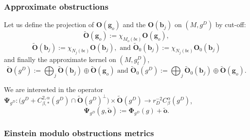 \documentclass[12pt]{article}
\begin{document}
    \subsubsection{Approximate obstructions}
    Let us define the projection of $\mathbf{O}(\mathbf{g}_o)$ and the $\mathbf{O}(\mathbf{b}_j)$ on $(M,g^D)$ by cut-off:
    \begin{equation}
        \tilde{\mathbf{O}}(\mathbf{g}_o):=\chi_{M_o(b\epsilon)}\mathbf{O}(\mathbf{g}_o),\label{tildOgo}
    \end{equation}
    \begin{equation}
        \tilde{\mathbf{O}}(\mathbf{b}_j):=\chi_{N_j(b\epsilon)}\mathbf{O}(\mathbf{b}_j), \text{ and } \tilde{\mathbf{O}}_0(\mathbf{b}_j):=\chi_{N_j(b\epsilon)}\mathbf{O}_0(\mathbf{b}_j) \label{tildOgb}
    \end{equation}
    and finally the approximate kernel on $(M,g^D_t)$,
    \begin{equation}
        \tilde{\mathbf{O}}(g^D):= \bigoplus_j\tilde{\mathbf{O}}(\mathbf{b}_j) \oplus \tilde{\mathbf{O}}(\mathbf{g}_o) \text{ and } \tilde{\mathbf{O}}_0(g^D):= \bigoplus_j\tilde{\mathbf{O}}_0(\mathbf{b}_j) \oplus \tilde{\mathbf{O}}(\mathbf{g}_o).\label{tildOgD}
    \end{equation}
    
    We are interested in the operator $\mathbf{\Psi}_{g^D}: \big(g^D+C^{2,\alpha}_{\beta,*}(g^D)\cap \tilde{\mathbf{O}}(g^D)^\perp\big)\times \tilde{\mathbf{O}}(g^D)\to r_D^{-2}C^\alpha_\beta(g^D)$,
    \begin{equation}
        \mathbf{\Psi}_{g^D}(g,\tilde{\mathbf{o}}):=\mathbf{\Phi}_{g^D}(g) +\tilde{\mathbf{o}}.\label{def Psi gD}
    \end{equation}
    
    \subsubsection{Einstein modulo obstructions metrics}
    
\end{document}
